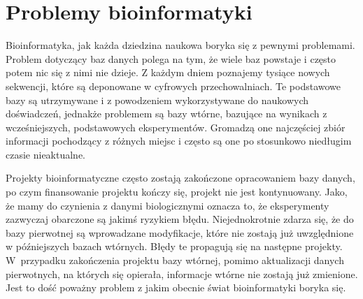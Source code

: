 
\section{Problemy bioinformatyki}
Bioinformatyka, jak każda dziedzina naukowa boryka się z pewnymi problemami. Problem dotyczący baz danych polega na tym, że wiele baz powstaje i często potem nic się z nimi nie dzieje. Z każdym dniem poznajemy tysiące nowych sekwencji, które są deponowane w cyfrowych przechowalniach. Te podstawowe bazy są utrzymywane i z powodzeniem wykorzystywane do naukowych doświadczeń, jednakże problemem są bazy wtórne, bazujące na wynikach z wcześniejszych, podstawowych eksperymentów. Gromadzą one najczęściej zbiór informacji pochodzący z różnych miejsc i często są one po stosunkowo niedługim czasie nieaktualne.

Projekty bioinformatyczne często zostają zakończone opracowaniem bazy danych, po czym finansowanie projektu kończy się, projekt nie jest kontynuowany.
Jako, że mamy do czynienia z danymi biologicznymi oznacza to, że eksperymenty zazwyczaj obarczone są jakimś ryzykiem błędu. Niejednokrotnie zdarza się, że do bazy pierwotnej są wprowadzane modyfikacje, które nie zostają już uwzględnione w późniejszych bazach wtórnych. Błędy te propagują się na następne projekty. W~przypadku zakończenia projektu bazy wtórnej, pomimo aktualizacji danych pierwotnych, na których się opierała, informacje wtórne nie zostają już zmienione. Jest to dość poważny problem z jakim obecnie świat bioinformatyki boryka się.

